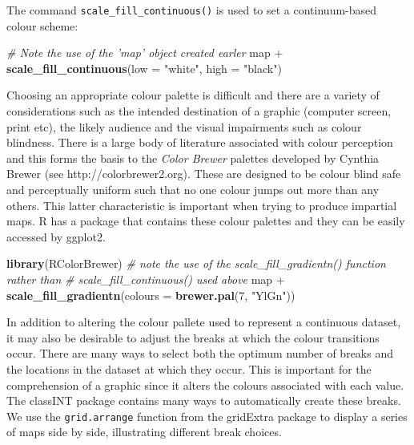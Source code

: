 \documentclass[]{article}
\newenvironment{Shaded}{}{}
\newcommand{\KeywordTok}[1]{\textcolor[rgb]{0.00,0.44,0.13}{\textbf{{#1}}}}
\newcommand{\DataTypeTok}[1]{\textcolor[rgb]{0.56,0.13,0.00}{{#1}}}
\newcommand{\DecValTok}[1]{\textcolor[rgb]{0.25,0.63,0.44}{{#1}}}
\newcommand{\StringTok}[1]{\textcolor[rgb]{0.25,0.44,0.63}{{#1}}}
\newcommand{\CommentTok}[1]{\textcolor[rgb]{0.38,0.63,0.69}{\textit{{#1}}}}
\newcommand{\NormalTok}[1]{{#1}}
\begin{document}
The command \texttt{scale\_fill\_continuous()} is used to set
a continuum-based colour scheme:

\begin{Shaded}
\begin{Highlighting}[]
\CommentTok{# Note the use of the 'map' object created earler}
\NormalTok{map + }\KeywordTok{scale_fill_continuous}\NormalTok{(}\DataTypeTok{low =} \StringTok{"white"}\NormalTok{, }\DataTypeTok{high =} \StringTok{"black"}\NormalTok{)}
\end{Highlighting}
\end{Shaded}

Choosing an appropriate colour palette is difficult and there are a variety of considerations such as the intended destination of a graphic (computer screen, print etc), the likely audience and the visual impairments such as colour blindness. There is a large body of literature associated with colour perception and this forms the basis to the \emph{Color Brewer} palettes developed
by Cynthia Brewer (see http://colorbrewer2.org). These are designed to
be colour blind safe and perceptually uniform such that no one colour
jumps out more than any others. This latter characteristic is important
when trying to produce impartial maps. R has a package that contains these
colour palettes and they can be easily accessed by ggplot2.

\begin{Shaded}
\begin{Highlighting}[]
\KeywordTok{library}\NormalTok{(RColorBrewer)}
\CommentTok{# note the use of the scale_fill_gradientn() function rather than}
\CommentTok{# scale_fill_continuous() used above}
\NormalTok{map + }\KeywordTok{scale_fill_gradientn}\NormalTok{(}\DataTypeTok{colours =} \KeywordTok{brewer.pal}\NormalTok{(}\DecValTok{7}\NormalTok{, }\StringTok{"YlGn"}\NormalTok{))}
\end{Highlighting}
\end{Shaded}

In addition to altering the colour pallete used to represent a continuous
dataset, it may also be desirable to adjust the breaks at which the colour
transitions occur. There are many ways to select both the optimum number
of breaks and the locations in the dataset at
which they occur. This is important for the comprehension of a graphic
since it alters the colours associated with each value. The
classINT package contains many ways to automatically create
these breaks. We use the \texttt{grid.arrange} function from the
gridExtra package to display a series of maps side by side,  illustrating different break choices. 
\end{document}
